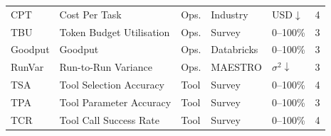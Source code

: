 \documentclass[11pt,a4paper]{article}
\begin{document}
\begin{longtable}{p{1.8cm}p{3.5cm}p{1.2cm}p{1.8cm}p{1.0cm}c}
  CPT            & Cost Per Task                  & Ops.    & Industry          & USD$\downarrow$ & 4 \\
  TBU            & Token Budget Utilisation       & Ops.    & Survey            & 0--100\%   & 3 \\
  Goodput        & Goodput                        & Ops.    & Databricks        & 0--100\%   & 3 \\
  RunVar         & Run-to-Run Variance            & Ops.    & MAESTRO           & $\sigma^2\downarrow$ & 3 \\
  \midrule
  TSA            & Tool Selection Accuracy        & Tool    & Survey            & 0--100\%   & 4 \\
  TPA            & Tool Parameter Accuracy        & Tool    & Survey            & 0--100\%   & 3 \\
  TCR            & Tool Call Success Rate         & Tool    & Survey            & 0--100\%   & 4 \\
\end{longtable}
\end{document}
